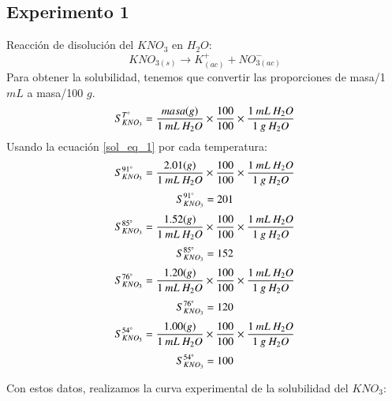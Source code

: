 \documentclass[../main.tex]{subfiles}
\begin{document}
\subsection{Experimento 1}
Reacción de disolución del $KNO_3$ en $H_2O$:
\[ KNO_{3(s)} \rightarrow K^+_{(ac)} + NO^-_{3(ac)} \]
Para obtener la solubilidad, tenemos que convertir las proporciones 
de masa/1 $mL$ a masa/100 $g$.
\begin{equation} \label{sol_eq_1}
    S^{T\degree}_{KNO_3} = \frac{masa (g)}{1\:mL\:H_2O} \times \frac{100}{100} \times \frac{1\:mL\:H_2O}{1\:g\:H_2O}
\end{equation}
Usando la ecuación \ref{sol_eq_1} por cada temperatura:
\[
    S^{91\degree}_{KNO_3} = \frac{2.01 (g)}{1\:mL\:H_2O} \times \frac{100}{100} \times \frac{1\:mL\:H_2O}{1\:g\:H_2O}
\]
\[
    S^{91\degree}_{KNO_3} = 201
\]\[
    S^{85\degree}_{KNO_3} = \frac{1.52 (g)}{1\:mL\:H_2O} \times \frac{100}{100} \times \frac{1\:mL\:H_2O}{1\:g\:H_2O}
\]
\[
    S^{85\degree}_{KNO_3} = 152
\]\[
    S^{76\degree}_{KNO_3} = \frac{1.20 (g)}{1\:mL\:H_2O} \times \frac{100}{100} \times \frac{1\:mL\:H_2O}{1\:g\:H_2O}
\]
\[
    S^{76\degree}_{KNO_3} = 120
\]\[
    S^{54\degree}_{KNO_3} = \frac{1.00 (g)}{1\:mL\:H_2O} \times \frac{100}{100} \times \frac{1\:mL\:H_2O}{1\:g\:H_2O}
\]
\[
    S^{54\degree}_{KNO_3} = 100
\]

Con estos datos, realizamos la curva experimental de la solubilidad del $KNO_3$:
\bigskip
\begin{center} 
\end{center}
\end{document}
